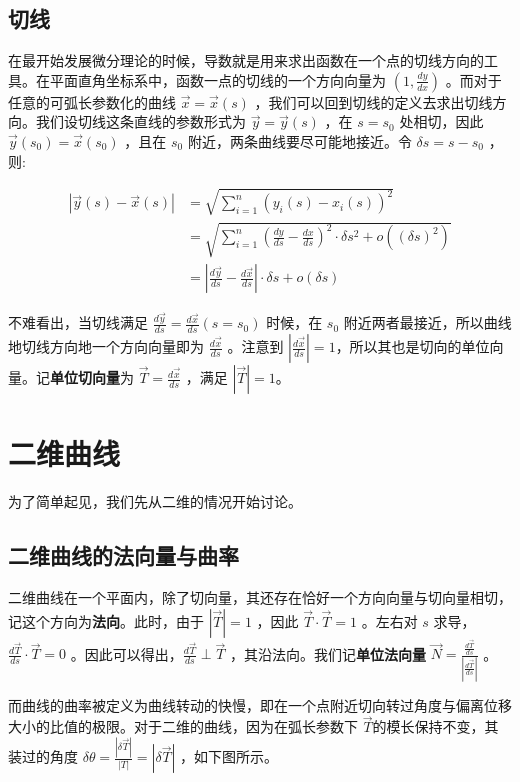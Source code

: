 \documentclass[fontset=windows]{article}
\begin{document}
\subsection{切线}

在最开始发展微分理论的时候，导数就是用来求出函数在一个点的切线方向的工具。在平面直角坐标系中，函数一点的切线的一个方向向量为 $(1,\frac{dy}{dx})$ 。而对于任意的可弧长参数化的曲线 $\vec{x} = \vec{x}(s) $ ，我们可以回到切线的定义去求出切线方向。我们设切线这条直线的参数形式为 $\vec{y} = \vec{y}(s)$ ，在 $ s = s_0 $ 处相切，因此 $\vec{y}(s_0) = \vec{x}(s_0)$ ，且在 $s_0$ 附近，两条曲线要尽可能地接近。令 $\delta{s} =s -s_0$ ，则:

$$
\begin{aligned}
|\vec{y}(s) - \vec{x}(s)| 
&= \sqrt{\sum_{i=1}^{n}{(y_i(s) - x_i(s)) ^ 2}} \\
&= \sqrt{\sum_{i=1}^{n}{(\frac{dy}{ds}-\frac{dx}{ds})^2 \cdot\delta{s}^2} + o({(δs)^2})} \\
&= |\frac{d\vec{y}}{ds} - \frac{d\vec{x}}{ds}| \cdot \delta{s} +o(\delta{s})
\end{aligned}
$$

不难看出，当切线满足 $\frac{d\vec{y}}{ds} = \frac{d\vec{x}}{ds} (s=s_0)$ 时候，在 $s_0$ 附近两者最接近，所以曲线地切线方向地一个方向向量即为 $\frac{d\vec{x}}{ds}$ 。注意到 $|\frac{d\vec{x}}{ds}| = 1$，所以其也是切向的单位向量。记\textbf{单位切向量}为 $\vec{T} = \frac{d\vec{x}}{ds}$ ，满足 $|\vec{T}| = 1$。

\section{二维曲线}

为了简单起见，我们先从二维的情况开始讨论。

\subsection{二维曲线的法向量与曲率}

二维曲线在一个平面内，除了切向量，其还存在恰好一个方向向量与切向量相切，记这个方向为\textbf{法向}。此时，由于 $|\vec{T}| = 1$ ，因此 $\vec{T} \cdot \vec{T} = 1$ 。左右对 $s$ 求导，$\frac{d\vec{T}}{ds} \cdot \vec{T} = 0$ 。因此可以得出，$\frac{d\vec{T}}{ds} \perp \vec{T}$ ，其沿法向。我们记\textbf{单位法向量} $\vec{N} = \frac{\frac{d\vec{T}}{ds}}{|\frac{d\vec{T}}{ds}|} $ 。

而曲线的曲率被定义为曲线转动的快慢，即在一个点附近切向转过角度与偏离位移大小的比值的极限。对于二维的曲线，因为在弧长参数下 $\vec{T}$的模长保持不变，其装过的角度 $\delta \theta = \frac{|\delta{\vec{T}}|}{|T|} = |\delta{\vec{T}}|  $ ，如下图所示。
\end{document}
